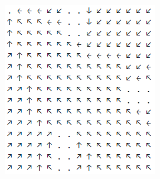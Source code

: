 \documentclass[12pt, a4paper]{article}
\begin{document}
\begin{figure}[h]
\begin{subfigure}{0.45\linewidth}
        \caption{}
    \end{subfigure}
    \newline
    \begin{subfigure}{0.45\linewidth}
        \centering
        \includegraphics[width=\linewidth]{images/q4/d/nocost/discount_05.png}
        \caption{}
    \end{subfigure}
    \hfill
    \begin{subfigure}{0.45\linewidth}
        \centering

\end{subfigure}
\end{figure}
\end{document}
